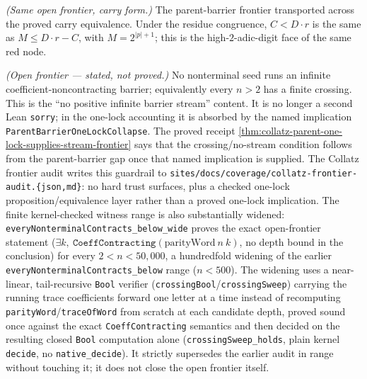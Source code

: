 \begin{theorem}
  \label{thm:collatz-residue-carry-gap-holds}
  \notready
  \emph{(Same open frontier, carry form.)} The parent-barrier frontier transported
  across the proved carry equivalence. Under the residue congruence, \(C<D\cdot r\)
  is the same as \(M\le D\cdot r-C\), with \(M=2^{|p|+1}\); this is the
  high-\(2\)-adic-digit face of the same red node.
\end{theorem}
\begin{theorem}
  \label{thm:collatz-crossing-holds}
  \notready
  \emph{(Open frontier --- stated, not proved.)} No nonterminal seed runs an infinite
  coefficient-noncontracting barrier; equivalently every $n>2$ has a finite crossing. This is
  the ``no positive infinite barrier stream'' content. It is no longer a second
  Lean \texttt{sorry}; in the one-lock accounting it is absorbed by the named
  implication \texttt{ParentBarrierOneLockCollapse}. The proved receipt
  \cref{thm:collatz-parent-one-lock-supplies-stream-frontier} says that the
  crossing/no-stream condition follows from the parent-barrier gap once that
  named implication is supplied. The Collatz frontier audit writes this guardrail
  to \texttt{sites/docs/coverage/collatz-frontier-audit.\{json,md\}}: no hard
  trust surfaces, plus a checked one-lock proposition/equivalence layer rather
  than a proved one-lock implication. The finite kernel-checked witness range is
  also substantially widened: \texttt{everyNonterminalContracts\_below\_wide}
  proves the exact open-frontier statement
  ($\exists k,\ \texttt{CoeffContracting}(\mathrm{parityWord}\ n\ k)$, no depth
  bound in the conclusion) for every $2<n<50{,}000$, a hundredfold widening of
  the earlier \texttt{everyNonterminalContracts\_below} range ($n<500$). The
  widening uses a near-linear, tail-recursive \texttt{Bool} verifier
  (\texttt{crossingBool}/\texttt{crossingSweep}) carrying the running trace
  coefficients forward one letter at a time instead of recomputing
  \texttt{parityWord}/\texttt{traceOfWord} from scratch at each candidate depth,
  proved sound once against the exact \texttt{CoeffContracting} semantics and
  then decided on the resulting closed \texttt{Bool} computation alone
  (\texttt{crossingSweep\_holds}, plain kernel \texttt{decide}, no
  \texttt{native\_decide}). It strictly supersedes the earlier audit in range
  without touching it; it does not close the open frontier itself.
\end{theorem}

